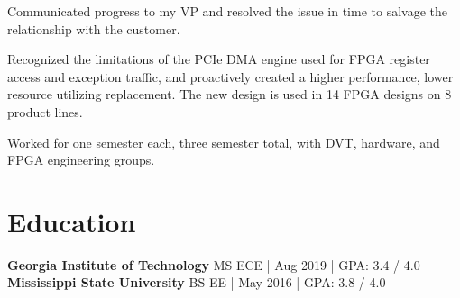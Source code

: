 \documentclass[1pt]{deedy-resume-reversed}
\begin{document}
\begin{minipage}[t]{1.0\textwidth}
\begin{tightemize}
Communicated progress to my VP and resolved the issue in time to salvage the relationship with the customer.
\item Recognized the limitations of the PCIe DMA engine used for FPGA register access and exception traffic,
and proactively created a higher performance, lower resource utilizing replacement. The new design is used in 14 FPGA designs on 8 product lines.
\end{tightemize}
\sectionsep

\begin{tightemize}
\item Worked for one semester each, three semester total, with DVT, hardware, and FPGA engineering groups.
\end{tightemize}
\sectionsep



\section{Education}
\textbf{Georgia Institute of Technology} MS ECE | Aug 2019 | GPA: 3.4 / 4.0 \\
\textbf{Mississippi State University} BS EE | May 2016 | GPA: 3.8 / 4.0 \\
\sectionsep

\end{minipage}
\end{document}

